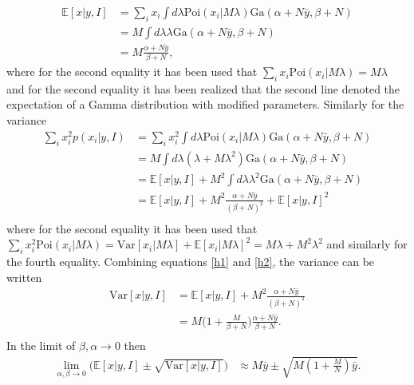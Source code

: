 \begin{equation}
	\begin{split}
		\mathbb{E}[x|y,I] &= \sum_ix_i\int d\lambda \text{Poi}(x_i|M\lambda)\text{Ga}(\alpha+N\bar{y},\beta +N)\\
		&= M\int d\lambda\lambda\text{Ga}(\alpha+N\bar{y},\beta +N)\\
		&= M \frac{\alpha+N\bar{y}}{\beta +N},
	\end{split}
\end{equation}
where for the second equality it has been used that $\sum_ix_i \text{Poi}(x_i|M\lambda)=M\lambda$ and for the second equality it has been realized that the second line denoted the expectation of a Gamma distribution with modified parameters. Similarly for the variance
\begin{equation}
	\begin{split}
		\sum_i x_i^2p(x_i|y,I) &=  \sum_ix_i^2\int d\lambda \text{Poi}(x_i|M\lambda)\text{Ga}(\alpha+N\bar{y},\beta +N)\\
		&=M\int d\lambda (\lambda +M\lambda^2)\text{Ga}(\alpha+N\bar{y},\beta +N)\\
		&=\mathbb{E}[x|y,I]+M^2\int d\lambda \lambda^2\text{Ga}(\alpha+N\bar{y},\beta +N)\\
		&=\mathbb{E}[x|y,I]+M^2\frac{\alpha+N\bar{y}}{(\beta +N)^2}+\mathbb{E}[x|y,I]^2\\
	\end{split}
	\label{h2}
\end{equation}
where for the second equality it has been used that $\sum_ix_i^2\text{Poi}(x_i|M\lambda)=\text{Var}[x_i|M\lambda]+\mathbb{E}[x_i|M\lambda]^2=M\lambda +M^2\lambda^2$ and similarly for the fourth equality. Combining equations \eqref{h1} and \eqref{h2}, the variance can be written
\begin{equation}
	\begin{split}
		\text{Var}[x|y,I] & = \mathbb{E}[x|y,I]+M^2\frac{\alpha+N\bar{y}}{(\beta +N)^2}\\
		& = M\bigg(1+\frac{M}{\beta+N}\bigg)\frac{\alpha+N\bar{y}}{\beta +N}.\\
	\end{split}
\end{equation}
In the limit of $\beta,\alpha\rightarrow 0$ then
\begin{equation}
	\begin{split}
		\lim\limits_{\alpha,\beta\rightarrow 0}\big(\mathbb{E}[x|y,I]\pm \sqrt{\text{Var}[x|y,I]}\big) &\approx M\bar{y}\pm \sqrt{M(1+\frac{M}{N})\bar{y}}.\\ 
	\end{split}
	\label{h3}
\end{equation}
